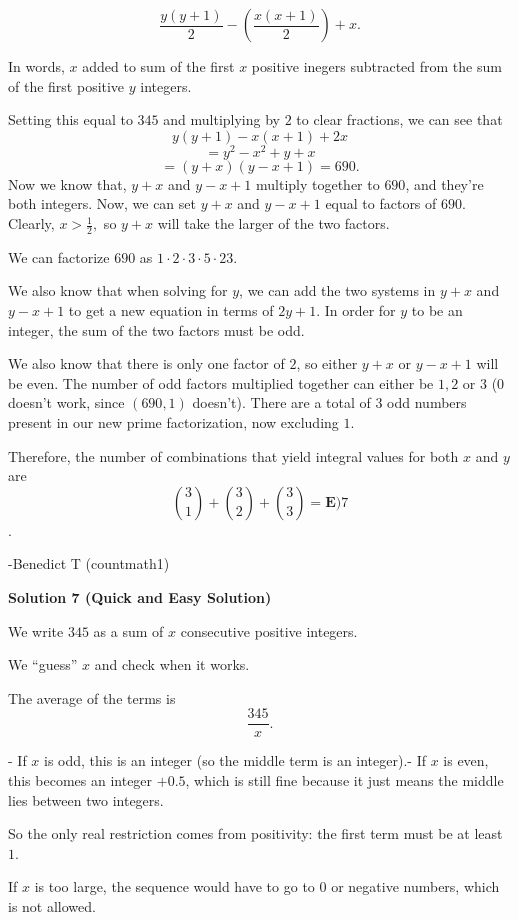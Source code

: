 \begin{enumerate}
 
 \[\frac{y(y+1)}{2}-\left(\frac{x(x+1)}{2}\right)+x.\]

 In words, $x$ added to sum of the first $x$ positive inegers subtracted from the sum of the first positive $y$ integers. 

 
Setting this equal to $345$ and multiplying by $2$ to clear fractions, we can see that
 \[y(y+1)-x(x+1)+2x\]
 \[=y^2-x^2+y+x\]
 \[=(y+x)(y-x+1)=690.\]Now we know that, $y+x$ and $y-x+1$ multiply together to $690$, and they're both integers. Now, we can set $y+x$ and $y-x+1$ equal to factors of $690$. Clearly, $x>\frac{1}{2},$ so $y+x$ will take the larger of the two factors. 

 We can factorize $690$ as $1\cdot2\cdot3\cdot5\cdot23$.

 We also know that when solving for $y$, we can add the two systems in $y+x$ and $y-x+1$ to get a new equation in terms of $2y+1.$ In order for $y$ to be an integer, the sum of the two factors must be odd.

 
We also know that there is only one factor of $2$, so either $y+x$ or $y-x+1$ will be even. The number of odd factors multiplied together can either be $1, 2$ or $3$ (0 doesn't work, since $(690, 1)$ doesn't). There are a total of $3$ odd numbers present in our new prime factorization, now excluding $1$. 

 
Therefore, the number of combinations that yield integral values for both $x$ and $y$ are 
 \[{3\choose1}+{3\choose2}+{3\choose3}= \boxed{\textbf{E)} 7}\].

 
-Benedict T (countmath1)

 



\textbf{Solution 7 (Quick and Easy Solution)}

We write $345$ as a sum of $x$ consecutive positive integers.

 We “guess” $x$ and check when it works.

 The average of the terms is
 \[\frac{345}{x}.\]

 - If $x$ is odd, this is an integer (so the middle term is an integer).- If $x$ is even, this becomes an integer $+ 0.5$, which is still fine because it just means the middle lies between two integers.

 So the only real restriction comes from positivity: the first term must be at least $1$.

 If $x$ is too large, the sequence would have to go to $0$ or negative numbers, which is not allowed.


\end{enumerate}
